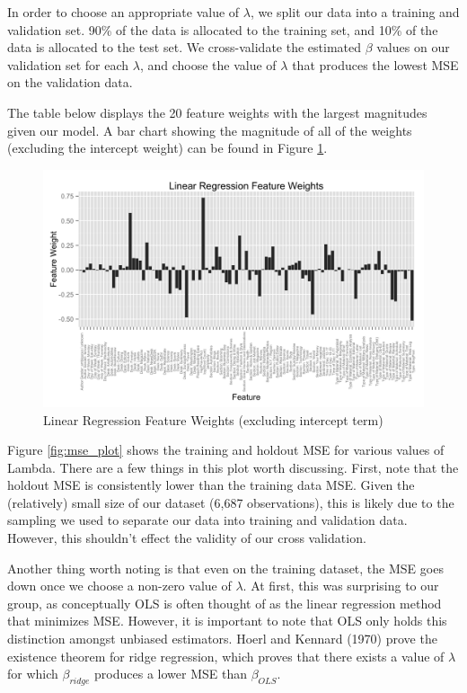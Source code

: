 \documentclass[fleqn,12pt]{SelfArx} %
\begin{document}
In order to choose an appropriate value of $\lambda$, we split our data into a training and validation set. 90\% of the data is allocated to the training set, and 10\% of the data is allocated to the test set. We cross-validate the estimated $\beta$ values on our validation set for each $\lambda$, and choose the value of $\lambda$ that produces the lowest MSE on the validation data.

The table below displays the 20 feature weights with the largest magnitudes given our model. A bar chart showing the magnitude of all of the weights (excluding the intercept weight) can be found in Figure \ref{fig:lin_reg_weights}.

\begin{figure}[ht]\centering
\includegraphics[width=\linewidth]{feature_weights.png}
\caption{Linear Regression Feature Weights (excluding intercept term)}
\label{fig:lin_reg_weights}
\end{figure}

Figure \ref{fig:mse_plot} shows the training and holdout MSE for various values of Lambda. There are a few things in this plot worth discussing. First, note that the holdout MSE is consistently lower than the training data MSE. Given the (relatively) small size of our dataset (6,687 observations), this is likely due to the sampling we used to separate our data into training and validation data. However, this shouldn't effect the validity of our cross validation.

Another thing worth noting is that even on the training dataset, the MSE goes down once we choose a non-zero value of $\lambda$. At first, this was surprising to our group, as conceptually OLS is often thought of as the linear regression method that minimizes MSE. However, it is important to note that OLS only holds this distinction amongst unbiased estimators. Hoerl and Kennard (1970) \cite{hoerl1970ridge} prove the existence theorem for ridge regression, which proves that there exists a value of $\lambda$ for which $\beta_{ridge}$ produces a lower MSE than $\beta_{OLS}$. 
\end{document}
